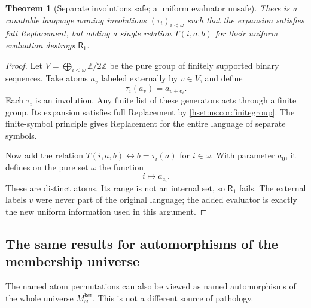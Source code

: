 \documentclass[11pt,letterpaper]{article}
\newtheorem{theorem}{Theorem}[section]
\theoremstyle{definition}
\theoremstyle{remark}
\newcommand{\cf}{\operatorname{cf}}
\newcommand{\lbl}[1]{\nolinkurl{#1}}
\newcommand{\repo}[1]{\nolinkurl{#1}}
\newcommand{\Mker}{M^{\mathrm{ker}}}
\begin{document}
\begin{theorem}[Separate involutions safe; a uniform evaluator unsafe]\label{hset:ns:thm:evaluator}
There is a countable language naming involutions $(\tau_i)_{i<\omega}$ such that the expansion satisfies full Replacement, but adding a single relation $T(i,a,b)$ for their uniform evaluation destroys $\mathsf R_1$.
\end{theorem}
\begin{proof}
Let $V=\bigoplus_{i<\omega}\mathbb Z/2\mathbb Z$ be the pure group of finitely supported binary sequences. Take atoms $a_v$ labeled externally by $v\in V$, and define
\[
 \tau_i(a_v)=a_{v+e_i}.
\]
Each $\tau_i$ is an involution. Any finite list of these generators acts through a finite group. Its expansion satisfies full Replacement by \cref{hset:ns:cor:finitegroup}. The finite-symbol principle gives Replacement for the entire language of separate symbols.

Now add the relation $T(i,a,b)\leftrightarrow b=\tau_i(a)$ for $i\in\omega$. With parameter $a_0$, it defines on the pure set $\omega$ the function
\[
 i\longmapsto a_{e_i}.
\]
These are distinct atoms. Its range is not an internal set, so $\mathsf R_1$ fails. The external labels $v$ were never part of the original language; the added evaluator is exactly the new uniform information used in this argument.
\end{proof}


\noindent[Added 4 October 2026, batch~93: Theorem~19.3 of
\repo{naming-elementary-embeddings} (Part~II, \lbl{nee:ca:uni:two_point}),
written later and independently, makes the same separation for the same group
$V=\bigoplus_{i<\omega}\mathbb Z/2\mathbb Z$ with a different witness: each
block of the action is the two-point action of one nonzero character, so every
orbit has at most two atoms and the failure comes from a uniform formula
distinguishing stabilizers, not from an infinite orbit. It holds in the kernel
models $\Mker_\kappa$ for every $\kappa$ with $\cf\kappa\le2^{\aleph_0}$, the
evaluator is amenable, and for $\cf\kappa>2^{\aleph_0}$ every uniformly named
action of $V$ keeps Replacement. At $\kappa=\omega$ that witness keeps
$\mathsf R_1$ and fails $\mathsf R_2$ by \cref{hset:ns:thm:graded} (an
observation recorded there at the write), whereas the regular action above
fails $\mathsf R_1$.]

\subsection{The same results for automorphisms of the membership universe}
The named atom permutations can also be viewed as named automorphisms of the whole universe $\Mker_\omega$. This is not a different source of pathology.
\end{document}
